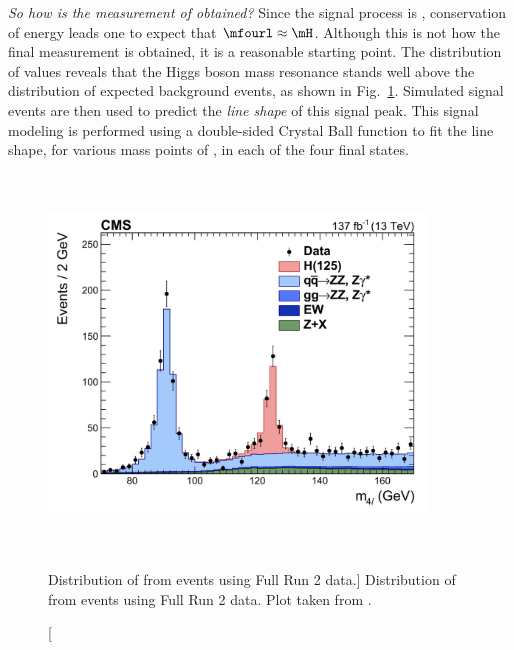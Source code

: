 \emph{So how is the measurement of \mH obtained?}
Since the signal process is \hzzfourl, conservation of energy leads one to expect that $\mfourl \approx \mH$.
Although this is not how the final measurement is obtained, it is a reasonable starting point.
The distribution of \mfourl values reveals that the Higgs boson mass resonance stands well above the distribution of expected background events, as shown in Fig.~\ref{fig:m4l_run2}.
Simulated signal events are then used to predict the \emph{line shape} of this signal peak.
This signal modeling is performed using a double-sided Crystal Ball function to fit the line shape, for various mass points of \mH, in each of the four final states.
\begin{figure}[pbth]
    \centering
    \includegraphics[width=10cm,height=10cm,keepaspectratio]{figures/higgsmassmeas/m4l_FullRun2_epjc.jpeg}
		\caption
			[Distribution of \mfourl from \hzzfourl events using Full Run 2 data.]
			{Distribution of \mfourl from \hzzfourl events using Full Run 2 data. Plot taken from .
			}
        \label{fig:m4l_run2}
\end{figure}

